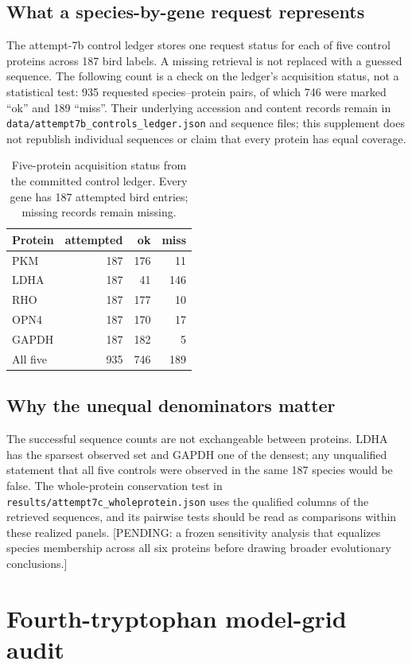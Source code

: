 \subsection{What a species-by-gene request represents}
The attempt-7b control ledger stores one request status for each of five control proteins across 187 bird labels. A missing retrieval is not replaced with a guessed sequence. The following count is a check on the ledger's acquisition status, not a statistical test: 935 requested species--protein pairs, of which 746 were marked ``ok'' and 189 ``miss''. Their underlying accession and content records remain in \texttt{data/attempt7b\_controls\_ledger.json} and sequence files; this supplement does not republish individual sequences or claim that every protein has equal coverage.\begin{table}[!htbp]\centering\small\caption{Five-protein acquisition status from the committed control ledger. Every gene has 187 attempted bird entries; missing records remain missing.}\begin{tabular}{lrrr}\hline Protein & attempted & ok & miss \\\hline
PKM & 187 & 176 & 11 \\
LDHA & 187 & 41 & 146 \\
RHO & 187 & 177 & 10 \\
OPN4 & 187 & 170 & 17 \\
GAPDH & 187 & 182 & 5 \\
\hline All five & 935 & 746 & 189 \\\hline\end{tabular}\end{table}
\subsection{Why the unequal denominators matter}
The successful sequence counts are not exchangeable between proteins. LDHA has the sparsest observed set and GAPDH one of the densest; any unqualified statement that all five controls were observed in the same 187 species would be false. The whole-protein conservation test in \texttt{results/attempt7c\_wholeprotein.json} uses the qualified columns of the retrieved sequences, and its pairwise tests should be read as comparisons within these realized panels. [PENDING: a frozen sensitivity analysis that equalizes species membership across all six proteins before drawing broader evolutionary conclusions.]

\section{Fourth-tryptophan model-grid audit}
